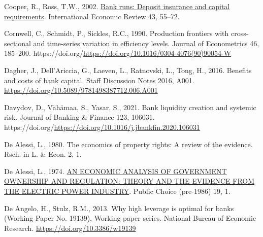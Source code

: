 \documentclass[
  12pt,
  a4paper,
]{scrreprt}
\newlength{\cslhangindent}
\newenvironment{CSLReferences}[2] %
 {\begin{list}{}{%
  \setlength{\itemindent}{0pt}
  \setlength{\leftmargin}{0pt}
  \setlength{\parsep}{0pt}
  \ifodd #1
   \setlength{\leftmargin}{\cslhangindent}
   \setlength{\itemindent}{-1\cslhangindent}
  \fi
  \setlength{\itemsep}{#2\baselineskip}}}
 {\end{list}}
\begin{document}
{{{{\begin{CSLReferences}{1}{0}
Cooper, R., Ross, T.W., 2002.
\href{http://www.jstor.org.queens.ezp1.qub.ac.uk/stable/827056}{Bank
runs: Deposit insurance and capital requirements}. International
Economic Review 43, 55--72.

Cornwell, C., Schmidt, P., Sickles, R.C., 1990. Production frontiers
with cross-sectional and time-series variation in efficiency levels.
Journal of Econometrics 46, 185--200.
https://doi.org/\url{https://doi.org/10.1016/0304-4076(90)90054-W}

Dagher, J., Dell'Ariccia, G., Laeven, L., Ratnovski, L., Tong, H., 2016.
Benefits and costs of bank capital. Staff Discussion Notes 2016, A001.
\url{https://doi.org/10.5089/9781498387712.006.A001}

Davydov, D., Vähämaa, S., Yasar, S., 2021. Bank liquidity creation and
systemic risk. Journal of Banking \& Finance 123, 106031.
https://doi.org/\url{https://doi.org/10.1016/j.jbankfin.2020.106031}

De Alessi, L., 1980. The economics of property rights: A review of the
evidence. Rsch. in L. \& Econ. 2, 1.

De Alessi, L., 1974.
\href{https://queens.ezp1.qub.ac.uk/login?url=https://www.proquest.com/scholarly-journals/economic-analysis-government-ownership-regulation/docview/236987376/se-2?accountid=13374\%0Ahttps://resolver.ebscohost.com/openurl?ctx_ver=Z39.88-2004&ctx_enc=info:ofi/enc:UTF-8&rfr_id=info:sid/ProQ\%3Aabiglobal&rft_val_fmt=info:ofi/fmt:kev:mtx:journal&rft.genre=unknown&rft.jtitle=Public+Choice+\%28pre-1986\%29&rft.atitle=AN+ECONOMIC+ANALYSIS+OF+GOVERNMENT+OWNERSHIP+AND+REGULATION\%3A+THEORY+AND+THE+EVIDENCE+FROM+THE+ELECTRIC+POWER+INDUSTRY&rft.au=De+Alessi\%2C+Louis&rft.aulast=De+Alessi&rft.aufirst=Louis&rft.date=1974-10-01&rft.volume=19&rft.issue=&rft.spage=1&rft.isbn=&rft.btitle=&rft.title=Public+Choice+\%28pre-1986\%29&rft.issn=00485829&rft_id=info:doi/}{AN
ECONOMIC ANALYSIS OF GOVERNMENT OWNERSHIP AND REGULATION: THEORY AND THE
EVIDENCE FROM THE ELECTRIC POWER INDUSTRY}. Public Choice (pre-1986) 19,
1.

De Angelo, H., Stulz, R.M., 2013. Why high leverage is optimal for banks
(Working Paper No. 19139), Working paper series. National Bureau of
Economic Research. \url{https://doi.org/10.3386/w19139}


\end{CSLReferences}}}}}
\end{document}
